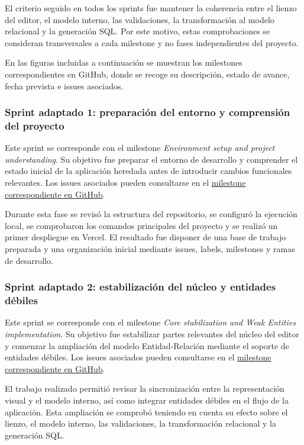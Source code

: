 El criterio seguido en todos los sprints fue mantener la coherencia entre el lienzo del editor, el modelo interno, las validaciones, la transformación al modelo relacional y la generación SQL. Por este motivo, estas comprobaciones se consideran transversales a cada milestone y no fases independientes del proyecto.

En las figuras incluidas a continuación se muestran los milestones correspondientes en GitHub, donde se recoge su descripción, estado de avance, fecha prevista e issues asociados.

\subsubsection{Sprint adaptado 1: preparación del entorno y comprensión del proyecto}

Este sprint se corresponde con el milestone \textit{Environment setup and project understanding}. Su objetivo fue preparar el entorno de desarrollo y comprender el estado inicial de la aplicación heredada antes de introducir cambios funcionales relevantes. Los issues asociados pueden consultarse en el \href{https://github.com/saa1002/draw-entity-relation/milestone/1?closed=1}{milestone correspondiente en GitHub}.

Durante esta fase se revisó la estructura del repositorio, se configuró la ejecución local, se comprobaron los comandos principales del proyecto y se realizó un primer despliegue en Vercel. El resultado fue disponer de una base de trabajo preparada y una organización inicial mediante issues, labels, milestones y ramas de desarrollo.


\subsubsection{Sprint adaptado 2: estabilización del núcleo y entidades débiles}

Este sprint se corresponde con el milestone \textit{Core stabilization and Weak Entities implementation}. Su objetivo fue estabilizar partes relevantes del núcleo del editor y comenzar la ampliación del modelo Entidad-Relación mediante el soporte de entidades débiles. Los issues asociados pueden consultarse en el \href{https://github.com/saa1002/draw-entity-relation/milestone/2?closed=1}{milestone correspondiente en GitHub}.

El trabajo realizado permitió revisar la sincronización entre la representación visual y el modelo interno, así como integrar entidades débiles en el flujo de la aplicación. Esta ampliación se comprobó teniendo en cuenta su efecto sobre el lienzo, el modelo interno, las validaciones, la transformación relacional y la generación SQL.

